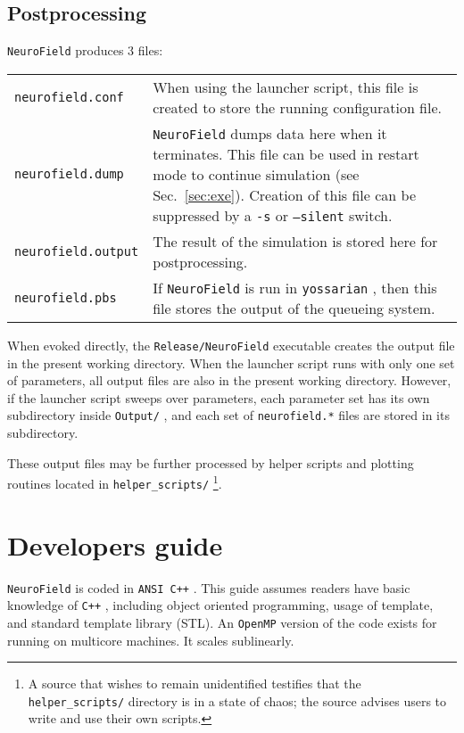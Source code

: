 \documentclass[12pt,a4paper]{article}
\newcommand{\type}[1]{ {\small\small\tt #1} }
\begin{document}
\subsection{Postprocessing}

\type{NeuroField} produces 3 files:

\begin{tabular}{l p{11.5cm}}
\type{neurofield.conf}& When using the launcher script, this file is created to store the running configuration file.\\
\type{neurofield.dump}& \type{NeuroField} dumps data here when it terminates. This file can be used in restart mode to continue simulation (see Sec.~\ref{sec:exe}). Creation of this file can be suppressed by a \type{-s} or \type{--silent} switch.\\
\type{neurofield.output}& The result of the simulation is stored here for postprocessing.\\
\type{neurofield.pbs}& If \type{NeuroField} is run in \type{yossarian}, then this file stores the output of the queueing system.
\end{tabular}

When evoked directly, the \type{Release/NeuroField} executable creates the output file in the present working directory. When the launcher script runs with only one set of parameters, all output files are also in the present working directory. However, if the launcher script sweeps over parameters, each parameter set has its own subdirectory inside \type{Output/}, and each set of \type{neurofield.*} files are stored in its subdirectory.

These output files may be further processed by helper scripts and plotting routines located in \type{helper\_scripts/}\footnote{A source that wishes to remain unidentified testifies that the \type{helper\_scripts/} directory is in a state of chaos; the source advises users to write and use their own scripts.}.

\pagebreak
\section{Developers guide}

\type{NeuroField} is coded in \type{ANSI C++}. This guide assumes readers have basic knowledge of \type{C++}, including object oriented programming, usage of template, and standard template library (STL). An \type{OpenMP} version of the code exists for running on multicore machines. It scales sublinearly.
\end{document}
